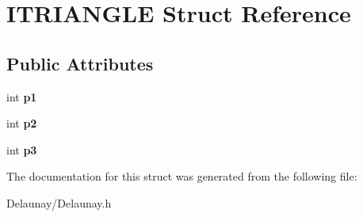 \hypertarget{struct_i_t_r_i_a_n_g_l_e}{}\section{I\+T\+R\+I\+A\+N\+G\+LE Struct Reference}
\label{struct_i_t_r_i_a_n_g_l_e}
\subsection*{Public Attributes}
\begin{DoxyCompactItemize}
\item 
\mbox{\label{struct_i_t_r_i_a_n_g_l_e_aa1e37637bc334917eebe0ebe876a1a7f}} 
int {\bfseries p1}
\item 
\mbox{\label{struct_i_t_r_i_a_n_g_l_e_a93d3170df8fd638bbefe05f86716bd98}} 
int {\bfseries p2}
\item 
\mbox{\label{struct_i_t_r_i_a_n_g_l_e_ae949f00b13e5ed72d47ee773ad4ce5b4}} 
int {\bfseries p3}
\end{DoxyCompactItemize}


The documentation for this struct was generated from the following file\+:\begin{DoxyCompactItemize}
\item 
Delaunay/Delaunay.\+h\end{DoxyCompactItemize}
